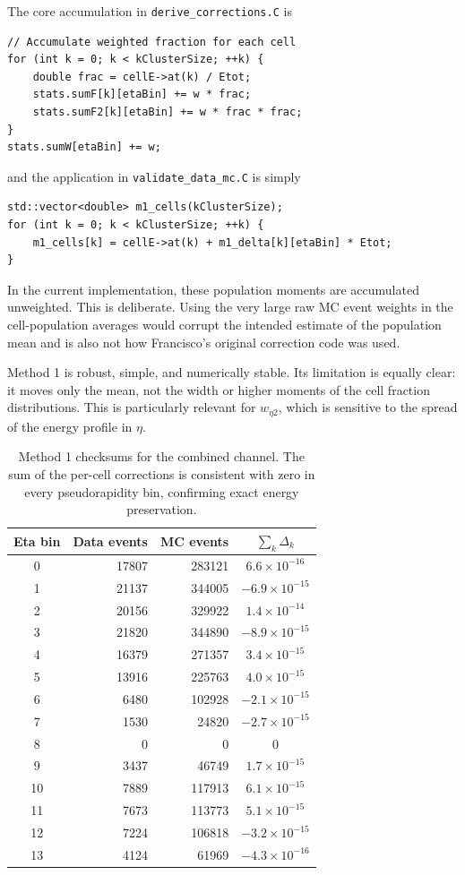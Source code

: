 \documentclass[11pt,a4paper]{article}
\newcommand{\weta}{\ensuremath{w_{\eta 2}}}
\begin{document}
The core accumulation in \texttt{derive\_corrections.C} is

\begin{lstlisting}
// Accumulate weighted fraction for each cell
for (int k = 0; k < kClusterSize; ++k) {
    double frac = cellE->at(k) / Etot;
    stats.sumF[k][etaBin] += w * frac;
    stats.sumF2[k][etaBin] += w * frac * frac;
}
stats.sumW[etaBin] += w;
\end{lstlisting}

and the application in \texttt{validate\_data\_mc.C} is simply

\begin{lstlisting}
std::vector<double> m1_cells(kClusterSize);
for (int k = 0; k < kClusterSize; ++k) {
    m1_cells[k] = cellE->at(k) + m1_delta[k][etaBin] * Etot;
}
\end{lstlisting}

In the current implementation, these population moments are accumulated
unweighted. This is deliberate. Using the very large raw MC event weights in
the cell-population averages would corrupt the intended estimate of the
population mean and is also not how Francisco's original correction code was
used.

Method 1 is robust, simple, and numerically stable. Its limitation is equally
clear: it moves only the mean, not the width or higher moments of the cell
fraction distributions. This is particularly relevant for \weta, which is
sensitive to the spread of the energy profile in $\eta$.

\begin{table}[H]
\centering
\caption{Method 1 checksums for the combined channel. The sum of the per-cell corrections is consistent with zero in every pseudorapidity bin, confirming exact energy preservation.}
\label{tab:m1-checksum}
\begin{tabular}{crrc}
\toprule
Eta bin & Data events & MC events & $\sum_k \Delta_k$ \\
\midrule
0 & 17807 & 283121 & $6.6 \times 10^{-16}$ \\
1 & 21137 & 344005 & $-6.9 \times 10^{-15}$ \\
2 & 20156 & 329922 & $1.4 \times 10^{-14}$ \\
3 & 21820 & 344890 & $-8.9 \times 10^{-15}$ \\
4 & 16379 & 271357 & $3.4 \times 10^{-15}$ \\
5 & 13916 & 225763 & $4.0 \times 10^{-15}$ \\
6 & 6480 & 102928 & $-2.1 \times 10^{-15}$ \\
7 & 1530 & 24820 & $-2.7 \times 10^{-15}$ \\
8 & 0 & 0 & 0 \\
9 & 3437 & 46749 & $1.7 \times 10^{-15}$ \\
10 & 7889 & 117913 & $6.1 \times 10^{-15}$ \\
11 & 7673 & 113773 & $5.1 \times 10^{-15}$ \\
12 & 7224 & 106818 & $-3.2 \times 10^{-15}$ \\
13 & 4124 & 61969 & $-4.3 \times 10^{-16}$ \\
\bottomrule
\end{tabular}
\end{table}
\end{document}
